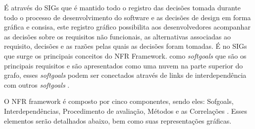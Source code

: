 É através do SIGs que é mantido todo o registro das decisões tomada durante todo o processo de desenvolvimento do software e as decisões de design em forma gráfica e consisa, este registro gráfico possibilita aos desenvolvedores acompanhar as decisões sobre os requisitos não funcionais, as alternativas associadas  ao requisito, decisões e as razões pelas quais as decisões foram tomadas. É no SIGs que surge os principais conceitos do NFR Framework. como \textit{softgoals} que são os principais requisitos e são apresentados como uma nuvem na parte superior do grafo, esses \textit{softgoals} podem ser conectados através de links de interdependência com outros \textit{softgoals} \cite{chung2012non}.

O NFR framework é composto por cinco componentes, sendo eles: Sofgoals, Interdependências, Procedimento de avaliação, Métodos e as Correlações \cite{chung2012non}. Esses elementos serão detalhados abaixo, bem como suas representações gráficas. 

